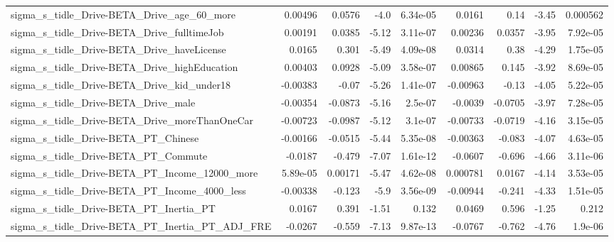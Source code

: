 \begin{tabular}{lrrrrrrrr}
sigma\_s\_tidle\_Drive-BETA\_Drive\_age\_60\_more         &     0.00496 &       0.0576 &     -4.0 & 6.34e-05 &     0.0161 &        0.14 &        -3.45 &      0.000562 \\
sigma\_s\_tidle\_Drive-BETA\_Drive\_fulltimeJob         &     0.00191 &       0.0385 &    -5.12 & 3.11e-07 &    0.00236 &      0.0357 &        -3.95 &      7.92e-05 \\
sigma\_s\_tidle\_Drive-BETA\_Drive\_haveLicense         &      0.0165 &        0.301 &    -5.49 & 4.09e-08 &     0.0314 &        0.38 &        -4.29 &      1.75e-05 \\
sigma\_s\_tidle\_Drive-BETA\_Drive\_highEducation       &     0.00403 &       0.0928 &    -5.09 & 3.58e-07 &    0.00865 &       0.145 &        -3.92 &      8.69e-05 \\
sigma\_s\_tidle\_Drive-BETA\_Drive\_kid\_under18         &    -0.00383 &        -0.07 &    -5.26 & 1.41e-07 &   -0.00963 &       -0.13 &        -4.05 &      5.22e-05 \\
sigma\_s\_tidle\_Drive-BETA\_Drive\_male                &    -0.00354 &      -0.0873 &    -5.16 &  2.5e-07 &    -0.0039 &     -0.0705 &        -3.97 &      7.28e-05 \\
sigma\_s\_tidle\_Drive-BETA\_Drive\_moreThanOneCar      &    -0.00723 &      -0.0987 &    -5.12 &  3.1e-07 &   -0.00733 &     -0.0719 &        -4.16 &      3.15e-05 \\
sigma\_s\_tidle\_Drive-BETA\_PT\_Chinese                &    -0.00166 &      -0.0515 &    -5.44 & 5.35e-08 &   -0.00363 &      -0.083 &        -4.07 &      4.63e-05 \\
sigma\_s\_tidle\_Drive-BETA\_PT\_Commute                &     -0.0187 &       -0.479 &    -7.07 & 1.61e-12 &    -0.0607 &      -0.696 &        -4.66 &      3.11e-06 \\
sigma\_s\_tidle\_Drive-BETA\_PT\_Income\_12000\_more      &    5.89e-05 &      0.00171 &    -5.47 & 4.62e-08 &   0.000781 &      0.0167 &        -4.14 &      3.53e-05 \\
sigma\_s\_tidle\_Drive-BETA\_PT\_Income\_4000\_less       &    -0.00338 &       -0.123 &     -5.9 & 3.56e-09 &   -0.00944 &      -0.241 &        -4.33 &      1.51e-05 \\
sigma\_s\_tidle\_Drive-BETA\_PT\_Inertia\_PT             &      0.0167 &        0.391 &    -1.51 &    0.132 &     0.0469 &       0.596 &        -1.25 &         0.212 \\
sigma\_s\_tidle\_Drive-BETA\_PT\_Inertia\_PT\_ADJ\_FRE     &     -0.0267 &       -0.559 &    -7.13 & 9.87e-13 &    -0.0767 &      -0.762 &        -4.76 &       1.9e-06 \\

\end{tabular}
